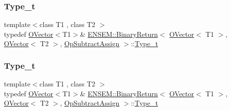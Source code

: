 \subsubsection{\texorpdfstring{Type\_t}{Type\_t}\hspace{0.1cm}{\footnotesize\ttfamily [1/3]}}
{\footnotesize\ttfamily template$<$class T1 , class T2 $>$ \\
typedef \mbox{\hyperlink{classENSEM_1_1OVector}{O\+Vector}}$<$T1$>$\& \mbox{\hyperlink{structENSEM_1_1BinaryReturn}{E\+N\+S\+E\+M\+::\+Binary\+Return}}$<$ \mbox{\hyperlink{classENSEM_1_1OVector}{O\+Vector}}$<$ T1 $>$, \mbox{\hyperlink{classENSEM_1_1OVector}{O\+Vector}}$<$ T2 $>$, \mbox{\hyperlink{structENSEM_1_1OpSubtractAssign}{Op\+Subtract\+Assign}} $>$\+::\mbox{\hyperlink{structENSEM_1_1BinaryReturn_3_01OVector_3_01T1_01_4_00_01OVector_3_01T2_01_4_00_01OpSubtractAssign_01_4_a5458d7236f7c48041a285b31ba719321}{Type\+\_\+t}}}

\mbox{\label{structENSEM_1_1BinaryReturn_3_01OVector_3_01T1_01_4_00_01OVector_3_01T2_01_4_00_01OpSubtractAssign_01_4_a5458d7236f7c48041a285b31ba719321}} 
\subsubsection{\texorpdfstring{Type\_t}{Type\_t}\hspace{0.1cm}{\footnotesize\ttfamily [2/3]}}
{\footnotesize\ttfamily template$<$class T1 , class T2 $>$ \\
typedef \mbox{\hyperlink{classENSEM_1_1OVector}{O\+Vector}}$<$T1$>$\& \mbox{\hyperlink{structENSEM_1_1BinaryReturn}{E\+N\+S\+E\+M\+::\+Binary\+Return}}$<$ \mbox{\hyperlink{classENSEM_1_1OVector}{O\+Vector}}$<$ T1 $>$, \mbox{\hyperlink{classENSEM_1_1OVector}{O\+Vector}}$<$ T2 $>$, \mbox{\hyperlink{structENSEM_1_1OpSubtractAssign}{Op\+Subtract\+Assign}} $>$\+::\mbox{\hyperlink{structENSEM_1_1BinaryReturn_3_01OVector_3_01T1_01_4_00_01OVector_3_01T2_01_4_00_01OpSubtractAssign_01_4_a5458d7236f7c48041a285b31ba719321}{Type\+\_\+t}}}


